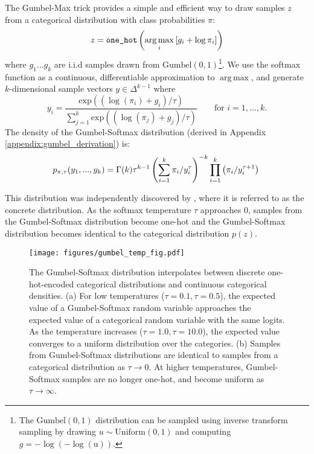 \documentclass{article} %
\DeclareMathOperator*{\argmax}{arg\,max}
\begin{document}
The Gumbel-Max trick \citep{13445,maddison2014sampling} provides a simple and efficient way to draw samples $z$ from a categorical distribution with class probabilities $\pi$: 
\begin{equation} \label{eq:gumbel}
z = \verb|one_hot|\left(\argmax_{i}{\left[ g_i + \log \pi_i \right]}\right)
\end{equation}
where $g_1...g_k$ are i.i.d samples drawn from $\text{Gumbel}(0,1)$\footnote{The $\text{Gumbel}(0,1)$ distribution can be sampled using inverse transform sampling by drawing $u \sim \text{Uniform}(0, 1)$ and computing $g= -\log(-\log(\text{u}))$. }.
We use the softmax function as a continuous, differentiable approximation to $\argmax$, and generate $k$-dimensional sample vectors $y \in \Delta^{k-1}$ where
\begin{equation}
y_i = \frac{\text{exp}((\log(\pi_i)+g_i)/\tau)}{\sum_{j=1}^k \text{exp}((\log(\pi_j)+g_j)/\tau)} \qquad \text{for } i=1, ..., k.
\end{equation}
The density of the Gumbel-Softmax distribution (derived in Appendix \ref{appendix:gumbel_derivation}) is:
\begin{equation}
p_{\pi, \tau}(y_1, ..., y_k) = \Gamma(k)\tau^{k-1}\left(\sum_{i=1}^{k} \pi_i/{y_i^\tau}\right)^{-k} \prod_{i=1}^k\left(\pi_i/y_i^{\tau+1}\right)\\
\end{equation}

This distribution was independently discovered by \citet{Maddison2016}, where it is referred to as the concrete distribution. As the softmax temperature $\tau$ approaches $0$, samples from the Gumbel-Softmax distribution become one-hot and the Gumbel-Softmax distribution becomes identical to the categorical distribution $p(z)$.%

\begin{figure}[h]
  \centering
  \hspace{-5mm}
\texttt{[image: figures/gumbel\_temp\_fig.pdf]}
  \caption{The Gumbel-Softmax distribution interpolates between discrete one-hot-encoded categorical distributions and continuous categorical densities. (a) For low temperatures ($\tau=0.1,\tau=0.5$), the expected value of a Gumbel-Softmax random variable approaches the expected value of a categorical random variable with the same logits. As the temperature increases ($\tau=1.0,\tau=10.0$), the expected value converges to a uniform distribution over the categories. (b) Samples from Gumbel-Softmax distributions are identical to samples from a categorical distribution as $\tau \to 0$. At higher temperatures, Gumbel-Softmax samples are no longer one-hot, and become uniform as $\tau \to \infty$. }
 \label{fig:gumbel_temp}
\end{figure}
\end{document}
